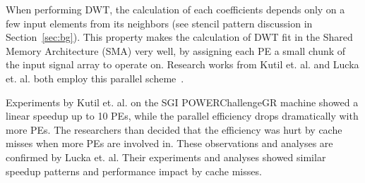 When performing DWT, the calculation of each coefficients depends only 
on a few input elements from its neighbors (see stencil pattern 
discussion in Section~\ref{sec:bg}).
%
This property makes the calculation of DWT fit in the 
Shared Memory Architecture (SMA) very well, 
by assigning each PE a small chunk of the input signal array
to operate on.
%
Research works from Kutil et. al. and Lucka et. al. both employ
this parallel scheme~\cite{kutil1999hardware, lucka2000parallel}.

Experiments by Kutil et. al. on the SGI POWERChallengeGR machine showed 
a linear speedup up to 10 PEs, while the parallel efficiency drops 
dramatically with more PEs.
%
The researchers than decided that the efficiency was hurt by 
cache misses when more PEs are involved in.
%
These observations and analyses are confirmed by Lucka et. al.
%
Their experiments and analyses showed similar speedup patterns
and performance impact by cache misses.
